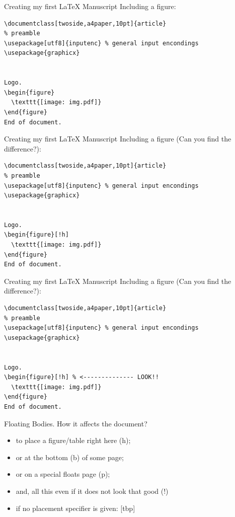 \begin{frame}[fragile]{Creating my first \LaTeX{} Manuscript}
Including a figure:
\footnotesize
\begin{verbatim}
\documentclass[twoside,a4paper,10pt]{article}
% preamble
\usepackage[utf8]{inputenc} % general input encondings
\usepackage{graphicx}


Logo.
\begin{figure}
  \texttt{[image: img.pdf]}
\end{figure}
End of document.

\end{verbatim}
\end{frame}

\begin{frame}[fragile]{Creating my first \LaTeX{} Manuscript}
Including a figure (Can you find the difference?):
\footnotesize
\begin{verbatim}
\documentclass[twoside,a4paper,10pt]{article}
% preamble
\usepackage[utf8]{inputenc} % general input encondings
\usepackage{graphicx}


Logo.
\begin{figure}[!h]
  \texttt{[image: img.pdf]}
\end{figure}
End of document.

\end{verbatim}
\end{frame}

\begin{frame}[fragile]{Creating my first \LaTeX{} Manuscript}
Including a figure (Can you find the difference?):
\footnotesize
\begin{verbatim}
\documentclass[twoside,a4paper,10pt]{article}
% preamble
\usepackage[utf8]{inputenc} % general input encondings
\usepackage{graphicx}


Logo.
\begin{figure}[!h] % <-------------- LOOK!!
  \texttt{[image: img.pdf]}
\end{figure}
End of document.

\end{verbatim}
\end{frame}


\begin{frame}{Floating Bodies.}
How it affects the document?
\begin{itemize}
\item to place a figure/table right here (h);
\item or at the bottom (b) of some page;
\item or on a special floats page (p);
\item and, all this even if it does not look that good (!)
\item if no placement specifier is given: [tbp]
\end{itemize}
\end{frame}

